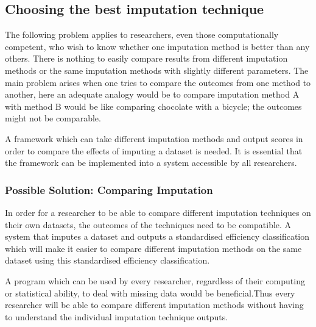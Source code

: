 \documentclass[conference,compsoc]{IEEEtran}
\begin{document}
		\subsection{Choosing the best imputation technique} %
		\label{sub:which_imputation_is_best_for_me}
			The following problem applies to researchers, even those computationally competent, who wish to know whether one imputation method is better than any others. There is nothing to easily compare results from different imputation methods or the same imputation methods with slightly different parameters. The main problem arises when one tries to compare the outcomes from one method to another, here an adequate analogy would be to compare imputation method A with method B would be like comparing chocolate with a bicycle; the outcomes might not be comparable. 

			A framework which can take different imputation methods and output scores in order to compare the effects of imputing a dataset is needed. It is essential that the framework can be implemented into a system accessible by all researchers. 

			\subsubsection{Possible Solution: Comparing Imputation} %
			\label{sub:possible_solution}
				In order for a researcher to be able to compare different imputation techniques on their own datasets, the outcomes of the techniques need to be compatible. A system that imputes a dataset and outputs a standardised efficiency classification which will make it easier to compare different imputation methods on the same dataset using this standardised efficiency classification. 

				 A program which can be used by every researcher, regardless of their computing or statistical ability, to deal with missing data would be beneficial.Thus every researcher will be able to compare different imputation methods without having to understand the individual imputation technique outputs.

 
\end{document}

